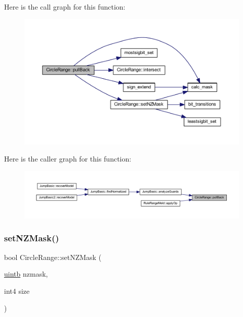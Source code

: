 Here is the call graph for this function\+:
\nopagebreak
\begin{figure}[H]
\begin{center}
\leavevmode
\includegraphics[width=350pt]{class_circle_range_a8b2b3063264a1169940c7131628b9a4b_cgraph}
\end{center}
\end{figure}
Here is the caller graph for this function\+:
\nopagebreak
\begin{figure}[H]
\begin{center}
\leavevmode
\includegraphics[width=350pt]{class_circle_range_a8b2b3063264a1169940c7131628b9a4b_icgraph}
\end{center}
\end{figure}
\mbox{\label{class_circle_range_a82f38601c64d4bdcc4aa977c2896b0f4}} 
\subsubsection{\texorpdfstring{setNZMask()}{setNZMask()}}
{\footnotesize\ttfamily bool Circle\+Range\+::set\+N\+Z\+Mask (\begin{DoxyParamCaption}\item[{\mbox{\hyperlink{types_8h_a2db313c5d32a12b01d26ac9b3bca178f}{uintb}}}]{nzmask,  }\item[{int4}]{size }\end{DoxyParamCaption})}



